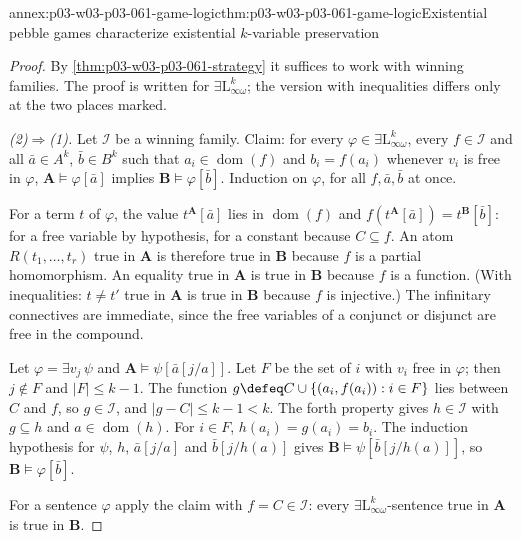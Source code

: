 \begin{annexitem}{annex:p03-w03-p03-061-game-logic}{thm:p03-w03-p03-061-game-logic}{Existential pebble games characterize existential \(k\)-variable preservation}
\begin{proof}
By \cref{thm:p03-w03-p03-061-strategy} it suffices to work with winning
families. The proof is written for \(\exists\mathrm L^k_{\infty\omega}\);
the version with inequalities differs only at the two places marked.

\emph{(2)\(\Rightarrow\)(1).} Let \(\mathcal I\) be a winning family. Claim:
for every \(\varphi\in\exists\mathrm L^k_{\infty\omega}\), every
\(f\in\mathcal I\) and all \(\bar a\in A^k\), \(\bar b\in B^k\) such that
\(a_i\in\operatorname{dom}(f)\) and \(b_i=f(a_i)\) whenever \(v_i\) is free in
\(\varphi\),
\(\mathbf A\models\varphi[\bar a]\) implies \(\mathbf B\models\varphi[\bar
b]\). Induction on \(\varphi\), for all \(f,\bar a,\bar b\) at once.

For a term \(t\) of \(\varphi\), the value \(t^{\mathbf A}[\bar a]\) lies in
\(\operatorname{dom}(f)\) and \(f(t^{\mathbf A}[\bar a])=t^{\mathbf B}[\bar
b]\): for a free variable by hypothesis, for a constant because \(C\subseteq
f\). An atom \(R(t_1,\ldots,t_r)\) true in \(\mathbf A\) is therefore true in
\(\mathbf B\) because \(f\) is a partial homomorphism. An equality true in
\(\mathbf A\) is true in \(\mathbf B\) because \(f\) is a function. (With
inequalities: \(t\neq t'\) true in \(\mathbf A\) is true in \(\mathbf B\)
because \(f\) is injective.) The infinitary connectives are immediate, since
the free variables of a conjunct or disjunct are free in the compound.

Let \(\varphi=\exists v_j\,\psi\) and \(\mathbf A\models\psi[\bar a[j/a]]\).
Let \(F\) be the set of \(i\) with \(v_i\) free in \(\varphi\); then
\(j\notin F\) and \(|F|\le k-1\). The function
\(g\defeq C\cup\{(a_i,f(a_i)):i\in F\}\) lies between \(C\) and \(f\), so
\(g\in\mathcal I\), and \(|g-C|\le k-1<k\). The forth property gives
\(h\in\mathcal I\) with \(g\subseteq h\) and \(a\in\operatorname{dom}(h)\).
For \(i\in F\), \(h(a_i)=g(a_i)=b_i\). The induction hypothesis for
\(\psi\), \(h\), \(\bar a[j/a]\) and \(\bar b[j/h(a)]\) gives
\(\mathbf B\models\psi[\bar b[j/h(a)]]\), so \(\mathbf B\models\varphi[\bar
b]\).

For a sentence \(\varphi\) apply the claim with \(f=C\in\mathcal I\): every
\(\exists\mathrm L^k_{\infty\omega}\)-sentence true in \(\mathbf A\) is true
in \(\mathbf B\).


\end{proof}
\end{annexitem}
